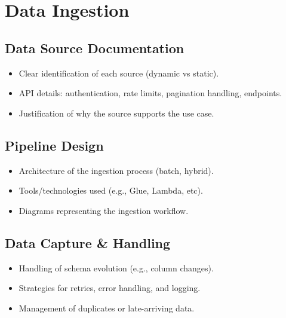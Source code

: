 \cleardoublepage%
\chapter{\label{chap:di}Data Ingestion}%

\section{\label{sec:di_ds}Data Source Documentation}

\begin{itemize}
\item Clear identification of each source (dynamic vs static).
\item API details: authentication, rate limits, pagination handling, endpoints.
\item Justification of why the source supports the use case.

\end{itemize}

\section{\label{sec:di_etl}Pipeline Design}
\begin{itemize}
    \item Architecture of the ingestion process (batch, hybrid).
\item Tools/technologies used (e.g., Glue, Lambda, etc).
\item Diagrams representing the ingestion workflow.

\end{itemize}

\section{\label{sec:di_etl}Data Capture \& Handling}
\begin{itemize}

\item Handling of schema evolution (e.g., column changes).
\item Strategies for retries, error handling, and logging.
\item Management of duplicates or late-arriving data.


\end{itemize}
